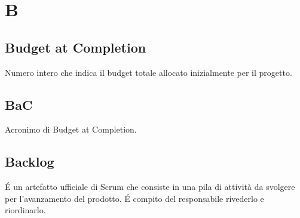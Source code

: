 \section{B}
\subsection{Budget at Completion}%
Numero intero che indica il budget totale allocato inizialmente per il progetto.
\subsection{BaC}%
Acronimo di Budget at Completion.

\subsection{Backlog}%
É un artefatto ufficiale di Scrum che consiste in una pila di attività da svolgere per l'avanzamento del prodotto. É compito del responsabile rivederlo e riordinarlo.
\clearpage